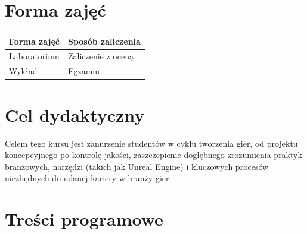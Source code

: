 \documentclass[12pt, a4paper]{article}
\begin{document}
\section{Forma zajęć}

\begin{tabular}{ll}
  \hline
  \textbf{Forma zajęć} & \textbf{Sposób zaliczenia} \\
  \hline
  Laboratorium & Zaliczenie z oceną \\
  Wykład & Egzamin \\
  \hline
\end{tabular}

\section{Cel dydaktyczny}

Celem tego kursu jest zanurzenie studentów w cyklu tworzenia gier, od projektu koncepcyjnego po kontrolę jakości, zaszczepienie dogłębnego zrozumienia praktyk branżowych, narzędzi (takich jak Unreal Engine) i kluczowych procesów niezbędnych do udanej kariery w branży gier.

\section{Treści programowe}
\end{document}
